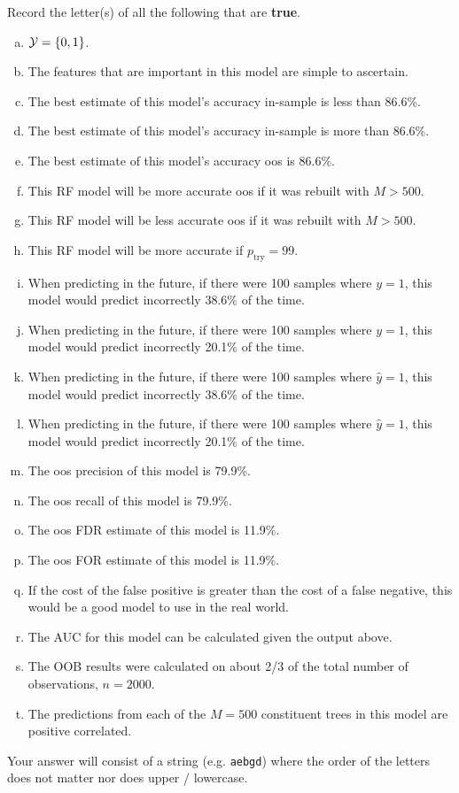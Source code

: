 \documentclass[12pt]{article}
\newcommand{\instr}{\small Your answer will consist of a string (e.g. \texttt{aebgd}) where the order of the letters does not matter nor does upper / lowercase. \normalsize}
\begin{document}
 Record the letter(s) of all the following that are \textbf{true}. 


\begin{enumerate}[(a)]
\item $\mathcal{Y} = \left\{0,1\right\}$.
\item The features that are important in this model are simple to ascertain.
\item The best estimate of this model's accuracy in-sample is less than 86.6\%.
\item The best estimate of this model's accuracy in-sample is more than 86.6\%.
\item The best estimate of this model's accuracy oos is 86.6\%.
\item This RF model will be more accurate oos if it was rebuilt with $M > 500$.
\item This RF model will be less accurate oos if it was rebuilt with $M > 500$.
\item This RF model will be more accurate if $p_{\text{try}} = 99$.
\item When predicting in the future, if there were 100 samples where $y=1$, this model would predict incorrectly 38.6\% of the time.
\item When predicting in the future, if there were 100 samples where $y=1$, this model would predict incorrectly 20.1\% of the time.
\item When predicting in the future, if there were 100 samples where $\hat{y}=1$, this model would predict incorrectly 38.6\% of the time.
\item When predicting in the future, if there were 100 samples where $\hat{y}=1$, this model would predict incorrectly 20.1\% of the time.
\item The oos precision of this model is 79.9\%.
\item The oos recall of this model is 79.9\%.
\item The oos FDR estimate of this model is 11.9\%.
\item The oos FOR estimate of this model is 11.9\%.
\item If the cost of the false positive is greater than the cost of a false negative, this would be a good model to use in the real world.
\item The AUC for this model can be calculated given the output above.
\item The OOB results were calculated on about 2/3 of the total number of observations, $n=2000$.
\item The predictions from each of the $M=500$ constituent trees in this model are positive correlated.
\end{enumerate}
\eenum\instr\pagebreak
\end{document}
